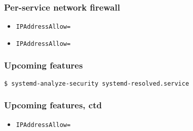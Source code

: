 \documentclass[serif]{beamer}
\begin{document}
\begin{frame}
  \frametitle{Per-service network firewall}
  
  \begin{itemize}
  \item \texttt{IPAddressAllow=}
  \item \texttt{IPAddressAllow=}
  \end{itemize}
\end{frame}

\begin{frame}[fragile]
  \frametitle{Upcoming features}

  \begin{verbatim}
$ systemd-analyze-security systemd-resolved.service
  \end{verbatim}
\end{frame}

\begin{frame}
  \frametitle{Upcoming features, ctd}

  \begin{itemize}
  \item \texttt{IPAddressAllow=}
  \end{itemize}
\end{frame}
\end{document}
